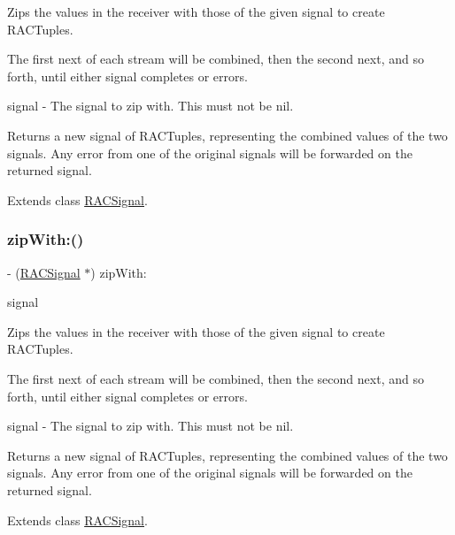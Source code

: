 Zips the values in the receiver with those of the given signal to create R\+A\+C\+Tuples.

The first {\ttfamily next} of each stream will be combined, then the second {\ttfamily next}, and so forth, until either signal completes or errors.

signal -\/ The signal to zip with. This must not be {\ttfamily nil}.

Returns a new signal of R\+A\+C\+Tuples, representing the combined values of the two signals. Any error from one of the original signals will be forwarded on the returned signal. 

Extends class \mbox{\hyperlink{interface_r_a_c_signal_ac822f657df311327de76bc55bcae689d}{R\+A\+C\+Signal}}.

\mbox{\label{category_r_a_c_signal_07_r_a_c_stream_08_ac822f657df311327de76bc55bcae689d}} 
\subsubsection{\texorpdfstring{zip\+With\+:()}{zipWith:()}\hspace{0.1cm}{\footnotesize\ttfamily [2/3]}}
{\footnotesize\ttfamily -\/ (\mbox{\hyperlink{interface_r_a_c_signal}{R\+A\+C\+Signal}} $\ast$) zip\+With\+: \begin{DoxyParamCaption}\item[{(\mbox{\hyperlink{interface_r_a_c_signal}{R\+A\+C\+Signal}} $\ast$)}]{signal }\end{DoxyParamCaption}}

Zips the values in the receiver with those of the given signal to create R\+A\+C\+Tuples.

The first {\ttfamily next} of each stream will be combined, then the second {\ttfamily next}, and so forth, until either signal completes or errors.

signal -\/ The signal to zip with. This must not be {\ttfamily nil}.

Returns a new signal of R\+A\+C\+Tuples, representing the combined values of the two signals. Any error from one of the original signals will be forwarded on the returned signal. 

Extends class \mbox{\hyperlink{interface_r_a_c_signal_ac822f657df311327de76bc55bcae689d}{R\+A\+C\+Signal}}.

